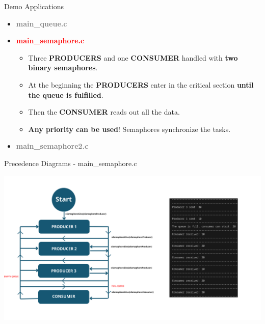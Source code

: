 \documentclass{beamer}
\begin{document}
\begin{frame}{Demo Applications}
        \begin{itemize}
        \item \textcolor{gray}{\textbf{main\_queue.c}}
        \item \textcolor{red}{\textbf{main\_semaphore.c}}
        \begin{itemize}
            \item Three \textbf{PRODUCERS} and one \textbf{CONSUMER} handled with \textbf{two binary semaphores}.
            \item At the beginning the \textbf{PRODUCERS} enter in the critical section \textbf{until the queue is fulfilled}.
            \item Then the \textbf{CONSUMER} reads out all the data.
            \item \textbf{Any priority can be used}! Semaphores synchronize the tasks.
        \end{itemize}
        \item \textcolor{gray}{\textbf{main\_semaphore2.c}}
    \end{itemize}
\end{frame}

\begin{frame}{Precedence Diagrams - main\_semaphore.c}

\vfill
\centering
\includegraphics[width=0.95\linewidth]{img/precedence_diagram_semaphore1.png} 
\vfill
    
\end{frame}
\end{document}
